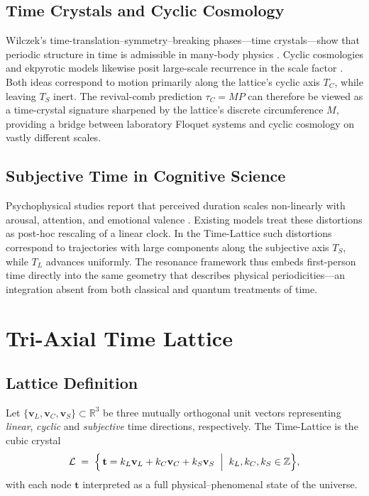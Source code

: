 \documentclass[11pt]{article}
\begin{document}
\subsection{Time Crystals and Cyclic Cosmology}
Wilczek’s time-translation\hspace{0pt}–\hspace{0pt}symmetry\hspace{0pt}–\hspace{0pt}breaking phases—time crystals—show\hspace{0pt}\cite{Wilczek2012}
that periodic structure in time is admissible in many-body physics
\cite{Wilczek2012,Yao2020}.  Cyclic cosmologies and ekpyrotic models
likewise posit large-scale recurrence in the scale factor
\cite{Khoury2001,Biswas2013}.  Both ideas correspond to motion primarily
along the lattice’s cyclic axis $T_C$, while leaving $T_S$ inert.
The revival-comb prediction $\tau_C = MP$ can therefore be viewed as a
time-crystal signature sharpened by the lattice’s discrete circumference
$M$, providing a bridge between laboratory Floquet systems and cyclic
cosmology on vastly different scales.

\subsection{Subjective Time in Cognitive Science}
Psychophysical studies report that perceived duration scales
non-linearly with arousal, attention, and emotional valence
\cite{Eagleman2008,Wittmann2016}.  Existing models treat these distortions
as post-hoc rescaling of a linear clock.  In the Time-Lattice such
distortions correspond to trajectories with large components along the
subjective axis $T_S$, while $T_L$ advances uniformly.  The resonance
framework thus embeds first-person time directly into the same geometry
that describes physical periodicities—an integration absent from both
classical and quantum treatments of time.

\section{Tri-Axial Time Lattice}

\subsection{Lattice Definition}\label{sec:lattice-def}
Let $\{\mathbf v_L,\mathbf v_C,\mathbf v_S\}\subset\mathbb R^{3}$ be
three mutually orthogonal unit vectors representing \emph{linear},
\emph{cyclic} and \emph{subjective} time directions, respectively.
The Time-Lattice is the cubic crystal
\begin{equation}
  \mathcal L \;=\; \Bigl\{\,
    \mathbf t = k_L \mathbf v_L + k_C \mathbf v_C + k_S \mathbf v_S
    \;\Bigm|\;
    k_L,k_C,k_S\in\mathbb Z
  \Bigr\},
\end{equation}
with each node $\mathbf t$ interpreted as a full physical–phenomenal
state of the universe.
\end{document}
